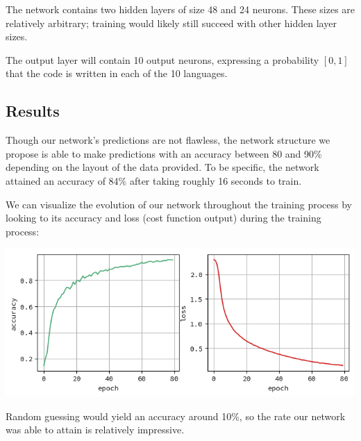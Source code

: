 \documentclass{article}
\begin{document}
The network contains two hidden layers of size 48 and 24 neurons. These sizes are relatively arbitrary; training would likely still succeed with other hidden layer sizes.

The output layer will contain 10 output neurons, expressing a probability $[0,1]$ that the code is written in each of the 10 languages.

\subsection{Results}
Though our network's predictions are not flawless, the network structure we propose is able to make predictions with an accuracy between 80 and 90\% depending on the layout of the data provided. To be specific, the network attained an accuracy of 84\% after taking roughly 16 seconds to train.

We can visualize the evolution of our network throughout the training process by looking to its accuracy and loss (cost function output) during the training process:

\begin{center}
    \includegraphics{history}
\end{center}

Random guessing would yield an accuracy around 10\%, so the rate our network was able to attain is relatively impressive.
\end{document}
